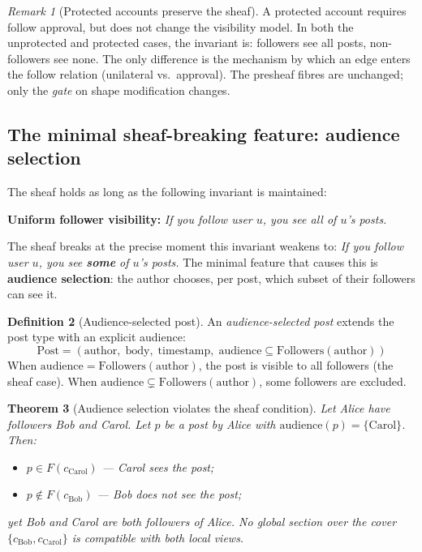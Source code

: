 \documentclass[11pt,a4paper]{article}
\theoremstyle{definition}
\newtheorem{definition}{Definition}[section]
\theoremstyle{plain}
\newtheorem{theorem}[definition]{Theorem}
\theoremstyle{remark}
\newtheorem{remark}[definition]{Remark}
\begin{document}
\begin{remark}[Protected accounts preserve the sheaf]
A protected account requires follow approval, but does not change the
visibility model. In both the unprotected and protected cases, the
invariant is: followers see all posts, non-followers see none. The
only difference is the mechanism by which an edge enters the follow
relation (unilateral vs.\ approval). The presheaf fibres are
unchanged; only the \emph{gate} on shape modification changes.
\end{remark}

\subsection{The minimal sheaf-breaking feature: audience selection}

The sheaf holds as long as the following invariant is maintained:

\medskip
\noindent\textbf{Uniform follower visibility:} \emph{If you follow
user $u$, you see all of $u$'s posts.}
\medskip

\noindent The sheaf breaks at the precise moment this invariant
weakens to: \emph{If you follow user $u$, you see \textbf{some} of
$u$'s posts.} The minimal feature that causes this is
\textbf{audience selection}: the author chooses, per post, which
subset of their followers can see it.

\begin{definition}[Audience-selected post]\label{def:audience}
An \emph{audience-selected post} extends the post type with an
explicit audience:
\[
  \mathrm{Post} = (\mathrm{author},\; \mathrm{body},\; \mathrm{timestamp},\; \mathrm{audience} \subseteq \mathrm{Followers}(\mathrm{author}))
\]
When $\mathrm{audience} = \mathrm{Followers}(\mathrm{author})$, the
post is visible to all followers (the sheaf case). When
$\mathrm{audience} \subsetneq \mathrm{Followers}(\mathrm{author})$,
some followers are excluded.
\end{definition}

\begin{theorem}[Audience selection violates the sheaf condition]\label{thm:audience-antisheaf}
Let Alice have followers Bob and Carol. Let $p$ be a post by Alice
with $\mathrm{audience}(p) = \{\text{Carol}\}$. Then:
\begin{itemize}[nosep]
  \item $p \in F(c_{\text{Carol}})$ --- Carol sees the post;
  \item $p \notin F(c_{\text{Bob}})$ --- Bob does not see the post;
\end{itemize}
yet Bob and Carol are both followers of Alice. No global section over
the cover $\{c_{\text{Bob}}, c_{\text{Carol}}\}$ is compatible with
both local views.
\end{theorem}
\end{document}
